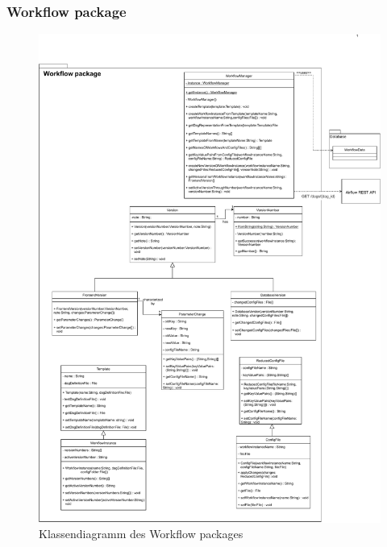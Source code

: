 \subsubsection{Workflow package}
\begin{figure}[H]
    \includegraphics[width=1\textwidth]{res/Klassen/wfPackage.pdf}
    \caption{Klassendiagramm des Workflow packages}
\end{figure}


